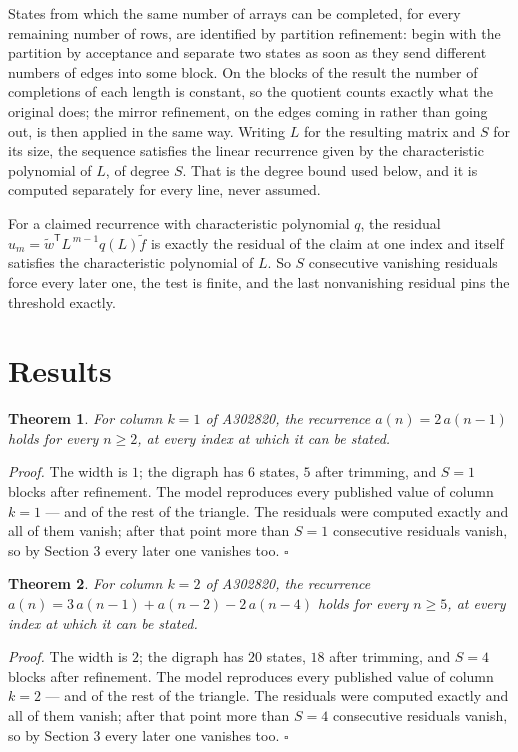 \documentclass[11pt]{article}
\newtheorem{theorem}{Theorem}
\theoremstyle{definition}
\begin{document}
States from which the same number of arrays can be completed, for every remaining number of rows, are identified by partition refinement: begin with the partition by acceptance and separate two states as soon as they send different numbers of edges into some block. On the blocks of the result the number of completions of each length is constant, so the quotient counts exactly what the original does; the mirror refinement, on the edges coming in rather than going out, is then applied in the same way. Writing $L$ for the resulting matrix and $S$ for its size, the sequence satisfies the linear recurrence given by the characteristic polynomial of $L$, of degree $S$. That is the degree bound used below, and it is computed separately for every line, never assumed.

For a claimed recurrence with characteristic polynomial $q$, the residual $u_m = \tilde w^{\mathsf T}L^{\,m-1}q(L)\tilde f$ is exactly the residual of the claim at one index and itself satisfies the characteristic polynomial of $L$. So $S$ consecutive vanishing residuals force every later one, the test is finite, and the last nonvanishing residual pins the threshold exactly.

\section{Results}

\begin{theorem} For column $k = 1$ of A302820, the recurrence $a(n) = 2\,a(n-1)$ holds for every $n \ge 2$, at every index at which it can be stated.\end{theorem}

{\itshape Proof.} The width is $1$; the digraph has $6$ states, $5$ after trimming, and $S = 1$ blocks after refinement. The model reproduces every published value of column $k = 1$ --- and of the rest of the triangle. The residuals were computed exactly and all of them vanish; after that point more than $S = 1$ consecutive residuals vanish, so by Section 3 every later one vanishes too. $\square$

\begin{theorem} For column $k = 2$ of A302820, the recurrence $a(n) = 3\,a(n-1) + a(n-2) - 2\,a(n-4)$ holds for every $n \ge 5$, at every index at which it can be stated.\end{theorem}

{\itshape Proof.} The width is $2$; the digraph has $20$ states, $18$ after trimming, and $S = 4$ blocks after refinement. The model reproduces every published value of column $k = 2$ --- and of the rest of the triangle. The residuals were computed exactly and all of them vanish; after that point more than $S = 4$ consecutive residuals vanish, so by Section 3 every later one vanishes too. $\square$
\end{document}
